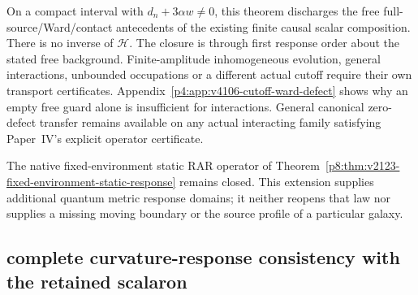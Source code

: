 \documentclass[12pt,a4paper]{article}
\begin{document}
On a compact interval with $d_n+3\alpha w\ne0$, this theorem discharges
the free full-source/Ward/contact antecedents of the existing finite
causal scalar composition. There is no inverse of $\mathcal H$.
The closure is through first response order about the stated free
background. Finite-amplitude inhomogeneous evolution, general interactions,
unbounded occupations or a different actual cutoff require their own
transport certificates. Appendix~\ref{p4:app:v4106-cutoff-ward-defect}
shows why an empty free guard alone is insufficient for interactions.
General canonical zero-defect transfer remains available on any actual
interacting family satisfying Paper~IV's explicit operator certificate.

The native fixed-environment static RAR operator of
Theorem~\ref{p8:thm:v2123-fixed-environment-static-response} remains closed.
This extension supplies additional quantum metric response domains;
it neither reopens that law nor supplies a missing moving boundary or
the source profile of a particular galaxy.




\subsection{complete curvature-response consistency with the retained scalaron}
\label{p8:sec:v2166-generalized-curvature-response}
\end{document}
